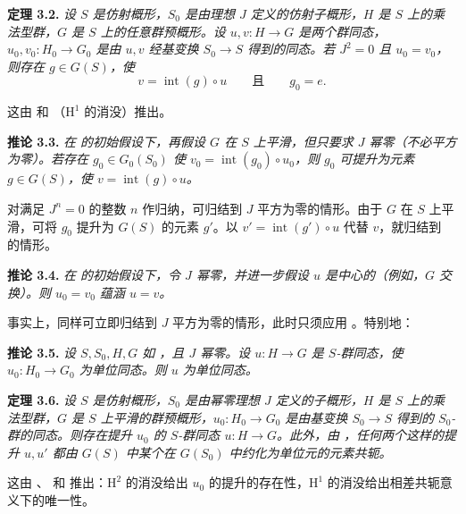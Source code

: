 \medskip
\noindent{}\textbf{定理 3.2.}
\textit{设 \(S\) 是仿射概形，\(S_0\) 是由理想 \(J\) 定义的仿射子概形，\(H\) 是 \(S\) 上的乘法型群，\(G\) 是 \(S\) 上的任意群预概形。设 \(u,v:H\to G\) 是两个群同态，\(u_0,v_0:H_0\to G_0\) 是由 \(u,v\) 经基变换 \(S_0\to S\) 得到的同态。若 \(J^2=0\) 且 \(u_0=v_0\)，则存在 \(g\in G(S)\)，使}
\[
  v=\operatorname{int}(g)\circ u
  \qquad\textit{且}\qquad
  g_0=e.
\]

这由  和 （\(\mathrm H^1\) 的消没）推出。

\medskip
\noindent{}\textbf{推论 3.3.}
\textit{在  的初始假设下，再假设 \(G\) 在 \(S\) 上平滑，但只要求 \(J\) 幂零（不必平方为零）。若存在 \(g_0\in G_0(S_0)\) 使 \(v_0=\operatorname{int}(g_0)\circ u_0\)，则 \(g_0\) 可提升为元素 \(g\in G(S)\)，使 \(v=\operatorname{int}(g)\circ u\)。}

对满足 \(J^n=0\) 的整数 \(n\) 作归纳，可归结到 \(J\) 平方为零的情形。由于 \(G\) 在 \(S\) 上平滑，可将 \(g_0\) 提升为 \(G(S)\) 的元素 \(g'\)。以 \(v'=\operatorname{int}(g')\circ u\) 代替 \(v\)，就归结到  的情形。

\medskip
\noindent{}\textbf{推论 3.4.}
\textit{在  的初始假设下，令 \(J\) 幂零，并进一步假设 \(u\) 是中心的（例如，\(G\) 交换）。则 \(u_0=v_0\) 蕴涵 \(u=v\)。}

事实上，同样可立即归结到 \(J\) 平方为零的情形，此时只须应用 。特别地：

\medskip
\noindent{}\textbf{推论 3.5.}
\textit{设 \(S,S_0,H,G\) 如 ，且 \(J\) 幂零。设 \(u:H\to G\) 是 \(S\)-群同态，使 \(u_0:H_0\to G_0\) 为单位同态。则 \(u\) 为单位同态。}

\medskip
\noindent{}\textbf{定理 3.6.}
\textit{设 \(S\) 是仿射概形，\(S_0\) 是由幂零理想 \(J\) 定义的子概形，\(H\) 是 \(S\) 上的乘法型群，\(G\) 是 \(S\) 上平滑的群预概形，\(u_0:H_0\to G_0\) 是由基变换 \(S_0\to S\) 得到的 \(S_0\)-群的同态。则存在提升 \(u_0\) 的 \(S\)-群同态 \(u:H\to G\)。此外，由 ，任何两个这样的提升 \(u,u'\) 都由 \(G(S)\) 中某个在 \(G(S_0)\) 中约化为单位元的元素共轭。}

这由 、 和  推出：\(\mathrm H^2\) 的消没给出 \(u_0\) 的提升的存在性，\(\mathrm H^1\) 的消没给出相差共轭意义下的唯一性。

